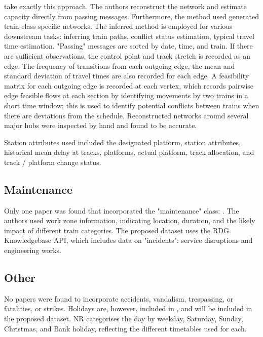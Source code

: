 \documentclass{article}
\begin{document}
\cite{nair_et_al_2019} take exactly this approach. The authors reconstruct the network and estimate capacity directly from passing messages. Furthermore, the method used generated train-class specific networks. The inferred method is employed for various downstream tasks: inferring train paths, conflict status estimation, typical travel time estimation. "Passing" messages are sorted by date, time, and train. If there are sufficient observations, the control point and track stretch is recorded as an edge. The frequency of transitions from each outgoing edge, the mean and standard deviation of travel times are also recorded for each edge. A feasibility matrix for each outgoing edge is recorded at each vertex, which records pairwise edge feasible flows at each section by identifying movements by two trains in a short time window; this is used to identify potential conflicts between trains when there are deviations from the schedule. Reconstructed networks around several major hubs were inspected by hand and found to be accurate. 

Station attributes used included the designated platform, station attributes, historical mean delay at tracks, platforms, actual platform, track allocation, and track / platform change status.


\subsection{Maintenance}

Only one paper was found that incorporated the "maintenance" class: \cite{nair_et_al_2019}. The authors used work zone information, indicating location, duration, and the likely impact of different train categories.
The proposed dataset uses the RDG Knowledgebase API, which includes data on "incidents": service disruptions and engineering works.


\subsection{Other}

No papers were found to incorporate accidents, vandalism, trespassing, or fatalities, or strikes. Holidays are, however, included in \cite{nair_et_al_2019}, and will be included in the proposed dataset. NR categorises the day by weekday, Saturday, Sunday, Christmas, and Bank holiday, reflecting the different timetables used for each.







\clearpage
\onecolumn

\printbibliography
 
\end{document}
